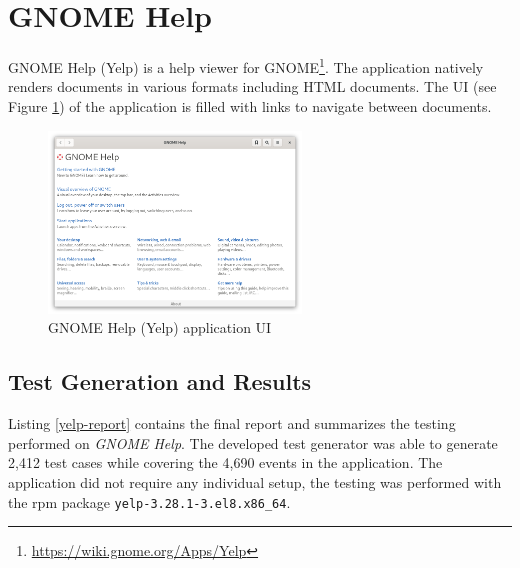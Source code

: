 

\section{GNOME Help}\label{}
GNOME Help (Yelp) is a help viewer for GNOME\footnote{\url{https://wiki.gnome.org/Apps/Yelp}}. The application natively renders documents in various formats including HTML documents. The UI (see Figure \ref{yelp_ui}) of the application is filled with links to navigate between documents.

\begin{figure}[H]
	\centering
	\includegraphics[width=0.6\textwidth,clip]{obrazky-figures/yelp-ui.png}
	\caption{GNOME Help (Yelp) application UI}
	\label{yelp_ui}
\end{figure}

\subsection*{Test Generation and Results}\label{firefox_bug}
Listing \ref{yelp-report} contains the final report and summarizes the testing performed on \textit{GNOME Help}. The developed test generator was able to generate 2,412 test cases while covering the 4,690 events in the application. The application did not require any individual setup, the testing was performed with the rpm package \texttt{yelp-3.28.1-3.el8.x86\_64}. 


